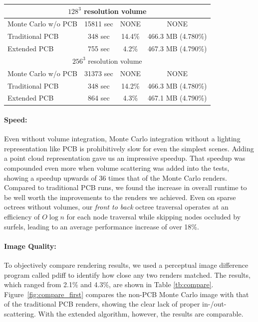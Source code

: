 \documentclass[runningheads]{llncs}
\begin{document}
\begin{table}
\begin{center}
\begin{tabular}[b]{ | l | c | c | c | }
  \hline
  \multicolumn{4}{|c|}{$128^3$ resolution volume} \\     
  \hline            
             
  Monte Carlo w/o PCB & 15811 sec & NONE & NONE \\
  Traditional PCB & 348 sec & 14.4\% & 466.3 MB (4.780\%) \\
  Extended PCB & 755 sec & 4.2\% & 467.3 MB (4.790\%)  \\

  \hline
  \multicolumn{4}{|c|}{$256^3$ resolution volume} \\     
  \hline            
             
  Monte Carlo w/o PCB & 31373 sec & NONE & NONE \\
  Traditional PCB & 348 sec & 14.2\% & 466.3 MB (4.780\%) \\
  Extended PCB & 864 sec & 4.3\% & 467.1 MB (4.790\%)  \\
  \hline  
\end{tabular}
\end{center}
\end{table}
\setlength{\tabcolsep}{1.4pt}

\paragraph{Speed:}
Even without volume integration, Monte Carlo integration without a lighting representation like PCB is prohibitively slow for even the simplest scenes.  Adding a point cloud representation gave us an impressive speedup.  That speedup was compounded even more when volume scattering was added into the tests, showing a speedup upwards of 36 times that of the Monte Carlo renders.  Compared to traditional PCB runs, we found the increase in overall runtime to be well worth the improvements to the renders we achieved. Even on sparse octrees without volumes, our \textit{front to back} octree traversal operates at an efficiency of $O\log{n}$ for each node traversal while skipping nodes occluded by surfels, leading to an average performance increase of over 18\%.

\paragraph{Image Quality:}
To objectively compare rendering results, we used a perceptual image difference program called pdiff to identify how close any two renders matched.  The results, which ranged from 2.1\% and 4.3\%, are shown in Table \ref{tb:compare}.  Figure~\ref{fig:compare_first} compares the non-PCB Monte Carlo image with that of the traditional PCB renders, showing the clear lack of proper in-/out-scattering.  With the extended algorithm, however, the results are comparable.
\end{document}
